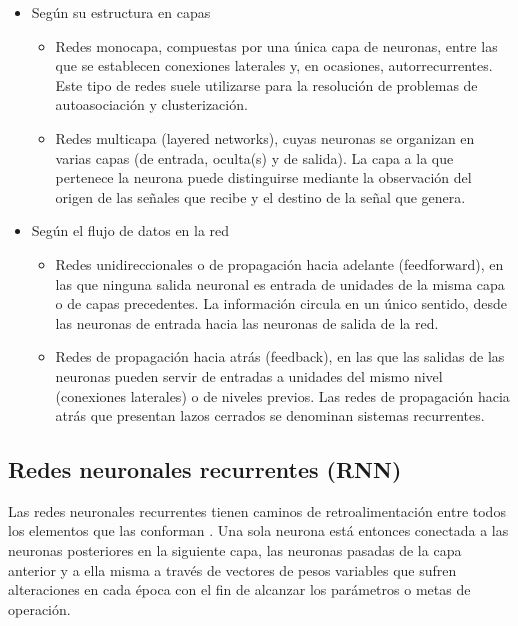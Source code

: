 \begin{itemize}
\item Según su estructura en capas
\begin{itemize}
  \item Redes monocapa, compuestas por una única capa de neuronas, entre las que se establecen conexiones laterales y, en ocasiones, autorrecurrentes. Este tipo de redes suele utilizarse para la resolución de problemas de autoasociación y clusterización.

  \item Redes multicapa (layered networks), cuyas neuronas se organizan en varias capas (de entrada, oculta(s) y de salida). La capa a la que pertenece la neurona puede distinguirse mediante la observación del origen de las señales que recibe y el destino de la señal que genera.
\end{itemize}

\item Según el flujo de datos en la red

\begin{itemize}
  \item Redes unidireccionales o de propagación hacia adelante (feedforward), en las que ninguna salida neuronal es entrada de unidades de la misma capa o de capas precedentes. La información circula en un único sentido, desde las neuronas de entrada hacia las neuronas de salida de la red.

  \item Redes de propagación hacia atrás (feedback), en las que las salidas de las neuronas pueden servir de entradas a unidades del mismo nivel (conexiones laterales) o de niveles previos. Las redes de propagación hacia atrás que presentan lazos cerrados se denominan sistemas recurrentes.
\end{itemize}
\end{itemize}

\subsection{Redes neuronales recurrentes (RNN)}

Las redes neuronales recurrentes tienen caminos de retroalimentación entre todos los elementos que las conforman \cite{montesdeoca2016estudios}. Una sola neurona está entonces conectada a las neuronas posteriores en la siguiente capa, las neuronas pasadas de la capa anterior y a ella misma a través de vectores de pesos variables que sufren alteraciones en cada época con el fin de alcanzar los parámetros o metas de operación.

